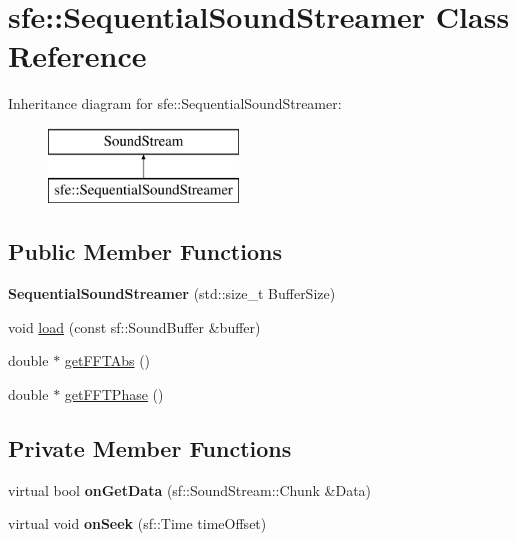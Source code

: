 \hypertarget{classsfe_1_1_sequential_sound_streamer}{\section{sfe\+:\+:Sequential\+Sound\+Streamer Class Reference}
\label{classsfe_1_1_sequential_sound_streamer}
}
Inheritance diagram for sfe\+:\+:Sequential\+Sound\+Streamer\+:\begin{figure}[H]
\begin{center}
\leavevmode
\includegraphics[height=2.000000cm]{classsfe_1_1_sequential_sound_streamer}
\end{center}
\end{figure}
\subsection*{Public Member Functions}
\begin{DoxyCompactItemize}
\item 
\hypertarget{classsfe_1_1_sequential_sound_streamer_a0889a532e125e6229911c87a4411149b}{{\bfseries Sequential\+Sound\+Streamer} (std\+::size\+\_\+t Buffer\+Size)}\label{classsfe_1_1_sequential_sound_streamer_a0889a532e125e6229911c87a4411149b}

\item 
void \hyperlink{classsfe_1_1_sequential_sound_streamer_a650824533bf27a504739798fc4291e69}{load} (const sf\+::\+Sound\+Buffer \&buffer)
\item 
double $\ast$ \hyperlink{classsfe_1_1_sequential_sound_streamer_a54215b061173c1c6b1bebe73a8e79cf0}{get\+F\+F\+T\+Abs} ()
\item 
double $\ast$ \hyperlink{classsfe_1_1_sequential_sound_streamer_a7c94675b37f7f18ae3b535b1c358fb3b}{get\+F\+F\+T\+Phase} ()
\end{DoxyCompactItemize}
\subsection*{Private Member Functions}
\begin{DoxyCompactItemize}
\item 
\hypertarget{classsfe_1_1_sequential_sound_streamer_af1725b5754b6980e7e989efb83b477ae}{virtual bool {\bfseries on\+Get\+Data} (sf\+::\+Sound\+Stream\+::\+Chunk \&Data)}\label{classsfe_1_1_sequential_sound_streamer_af1725b5754b6980e7e989efb83b477ae}

\item 
\hypertarget{classsfe_1_1_sequential_sound_streamer_a07c8a144a9aa501a81173c3d2206d33d}{virtual void {\bfseries on\+Seek} (sf\+::\+Time time\+Offset)}\label{classsfe_1_1_sequential_sound_streamer_a07c8a144a9aa501a81173c3d2206d33d}

\end{DoxyCompactItemize}
